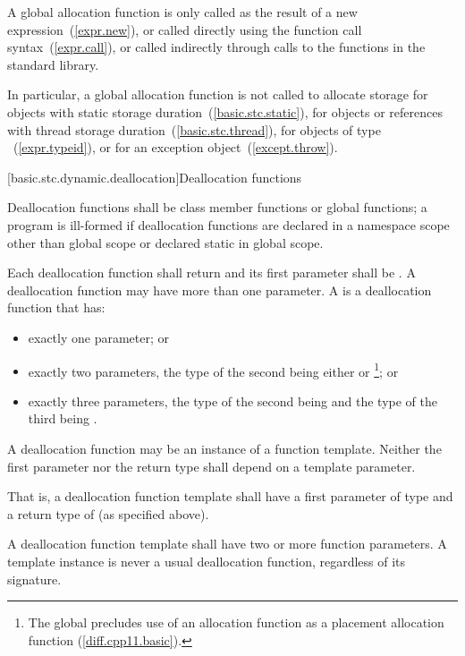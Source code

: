 \pnum
A global allocation function is only called as the result of a new
expression~(\ref{expr.new}), or called directly using the function call
syntax~(\ref{expr.call}), or called indirectly through calls to the
functions in the \Cpp standard library. \begin{note} In particular, a
global allocation function is not called to allocate storage for objects
with static storage duration~(\ref{basic.stc.static}), for objects or references
with thread storage duration~(\ref{basic.stc.thread}), for objects of
type ~(\ref{expr.typeid}), or for an
exception object~(\ref{except.throw}).
\end{note}

[basic.stc.dynamic.deallocation]{Deallocation functions}

\pnum
{}%
Deallocation functions shall be class member functions or global
functions; a program is ill-formed if deallocation functions are
declared in a namespace scope other than global scope or declared static
in global scope.

\pnum
{}%
Each deallocation function shall return  and its first
parameter shall be . A deallocation function may have more
than one parameter.
%
A  is a deallocation function that has:
\begin{itemize}
\item
exactly one parameter; or
\item
exactly two parameters,
the type of the second being either
 or
%
\footnote{The global 
precludes use of an
allocation function  as a placement
allocation function (\ref{diff.cpp11.basic}).}; or
\item
exactly three parameters,
the type of the second being 
and
the type of the third being .
\end{itemize}
A deallocation function may be an instance of a function
template. Neither the first parameter nor the return type shall depend
on a template parameter. \begin{note} That is, a deallocation function
template shall have a first parameter of type  and a return
type of  (as specified above). \end{note} A deallocation
function template shall have two or more function parameters. A template
instance is never a usual deallocation function, regardless of its
signature.

